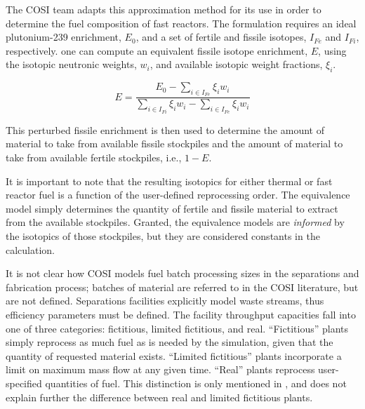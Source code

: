 The COSI team adapts this approximation method for its use in order to determine
the fuel composition of fast reactors. The formulation requires an ideal
plutonium-239 enrichment, $E_0$, and a set of fertile and fissile isotopes,
$I_{Fe}$ and $I_{Fi}$, respectively. one can compute an equivalent fissile
isotope enrichment, $E$, using the isotopic neutronic weights, $w_i$, and
available isotopic weight fractions, $\xi_i$.

\begin{equation}
E = \frac{E_0 - \sum_{i \in I_{Fe}} \xi_i w_i}
         {\sum_{i \in I_{Fi}} \xi_i w_i - \sum_{i \in I_{Fe}} \xi_i w_i}
\end{equation}

This perturbed fissile enrichment is then used to determine the amount of
material to take from available fissile stockpiles and the amount of material to
take from available fertile stockpiles, i.e., $1 - E$.

It is important to note that the resulting isotopics for either thermal or fast
reactor fuel is a function of the user-defined reprocessing order. The
equivalence model simply determines the quantity of fertile and fissile material
to extract from the available stockpiles. Granted, the equivalence models
are \textit{informed} by the isotopics of those stockpiles, but they are
considered constants in the calculation. 

It is not clear how COSI models fuel batch processing sizes in the separations
and fabrication process; batches of material are referred to in the COSI
literature, but are not defined.  Separations facilities explicitly model waste
streams, thus efficiency parameters must be defined. The facility throughput
capacities fall into one of three categories: fictitious, limited fictitious,
and real. ``Fictitious'' plants simply reprocess as much fuel as is needed by
the simulation, given that the quantity of requested material exists. ``Limited
fictitious'' plants incorporate a limit on maximum mass flow at any given
time. ``Real'' plants reprocess user-specified quantities of fuel. This
distinction is only mentioned in \cite{guerin_benchmark_2009}, and does not
explain further the difference between real and limited fictitious plants.


